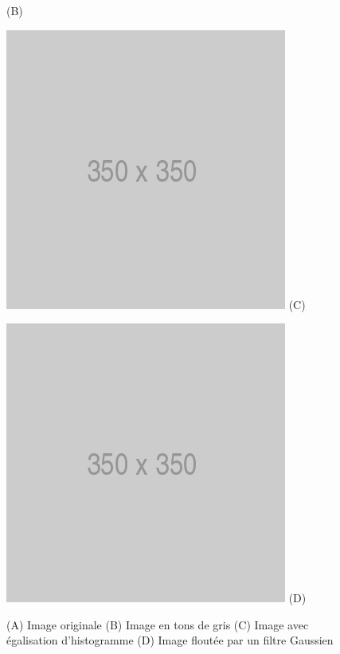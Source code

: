 \begin{figure}[htp]
\begin{minipage}{0.4\textwidth}
  (B)
\end{minipage}
\begin{minipage}{0.4\textwidth}
  \centering
  \includegraphics[width=\linewidth]{images/placeholder.png}
  (C)
\end{minipage}  
\begin{minipage}{0.4\textwidth}
  \centering
  \includegraphics[width=\linewidth]{images/placeholder.png}
  (D)
\end{minipage}  
\caption{(A) Image originale (B) Image en tons de gris (C) Image avec égalisation d'histogramme (D) Image floutée par un filtre Gaussien}
\label{fig:detection_pretraitement}
\end{figure}

